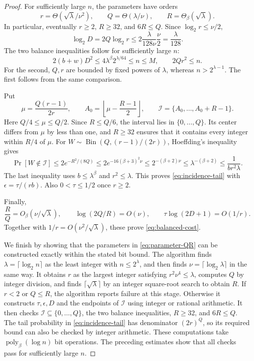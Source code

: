 \documentclass[11pt,reqno]{amsart}
\numberwithin{equation}{section}
\theoremstyle{definition}\newtheorem{definition}[theorem]{Definition}
\theoremstyle{remark}\newtheorem{remark}[theorem]{Remark}
\newcommand{\poly}{\operatorname{poly}}
\renewcommand{\le}{\leqslant}
\renewcommand{\ge}{\geqslant}
\begin{document}
\begin{proof}
For sufficiently large $n$, the parameters have orders
\[
 r=\Theta(\sqrt\lambda/\nu^2),\qquad
 Q=\Theta(\lambda/\nu),\qquad R=\Theta_\beta(\sqrt\lambda).
\]
In particular, eventually $r\ge2$, $R\ge32$, and $6R\le Q$.
Since $\log_2 r\le\nu/2$,
\[
 \log_2 D=2Q\log_2 r
 \le2\frac{\lambda}{128\nu}\frac\nu2=\frac{\lambda}{128}.
\]
The two balance inequalities follow for sufficiently large $n$:
\[
 2(b+w)D^2\le4\lambda^\beta2^{\lambda/64}\le n\le M,
 \qquad 2Qr^2\le n.
\]
For the second, $Q,r$ are bounded by fixed powers of $\lambda$,
whereas $n>2^{\lambda-1}$. The first follows from the same comparison.

Put
\[
 \mu=\frac{Q(r-1)}{2r},\qquad
 A_0=\left\lfloor\mu-\frac{R-1}{2}\right\rfloor,
 \qquad \mathcal I=\{A_0,\ldots,A_0+R-1\}.
\]
Here $Q/4\le\mu\le Q/2$. Since $R\le Q/6$, the interval lies in
$\{0,\ldots,Q\}$. Its center differs from $\mu$ by less than one,
and $R\ge32$ ensures that it contains every integer within $R/4$
of $\mu$. For $W\sim\operatorname{Bin}(Q,(r-1)/(2r))$, Hoeffding's
inequality gives
\[
 \Pr[W\notin\mathcal I]
 \le2e^{-R^2/(8Q)}
 \le2e^{-16(\beta+3)^2\nu}
 \le2^{-(\beta+2)\nu}
 \le\lambda^{-(\beta+2)}
 \le\frac1{br^2\lambda}.
\]
The last inequality uses $b\le\lambda^\beta$ and $r^2\le\lambda$.
This proves \eqref{eq:incidence-tail} with
$\epsilon=\tau/(rb)$. Also $0<\tau\le1/2$ once $r\ge2$.

Finally,
\[
 \frac RQ=O_\beta(\nu/\sqrt\lambda),\qquad
 \log(2Q/R)=O(\nu),\qquad
 \tau\log(2D+1)=O(1/r).
\]
Together with $1/r=O(\nu^2/\sqrt\lambda)$, these prove
\eqref{eq:balanced-cost}.

We finish by showing that the parameters in \eqref{eq:parameter-QR}
can be constructed exactly within the stated bit bound.
The algorithm finds $\lambda=\lceil\log_2 n\rceil$ as the least
integer with $n\le2^\lambda$, and then finds
$\nu=\lceil\log_2\lambda\rceil$ in the same way. It obtains $r$ as
the largest integer satisfying $r^2\nu^4\le\lambda$, computes $Q$
by integer division, and finds $\lceil\sqrt\lambda\rceil$ by an
integer square-root search to obtain $R$.
If $r<2$ or $Q\le R$, the algorithm reports failure at this stage.
Otherwise it constructs $\tau,\epsilon,D$ and the endpoints of
$\mathcal I$ using integer or rational arithmetic. It then checks
$\mathcal I\subseteq\{0,\ldots,Q\}$, the two balance inequalities,
$R\ge32$, and $6R\le Q$. The tail probability in
\eqref{eq:incidence-tail} has denominator $(2r)^Q$, so its required
bound can also be checked by integer arithmetic. These computations
take $\poly_\beta(\log n)$ bit operations. The preceding estimates
show that all checks pass for sufficiently large $n$.
\end{proof}
\end{document}
